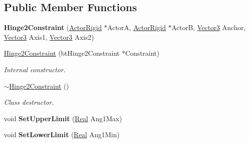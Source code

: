 \subsection*{Public Member Functions}
\begin{DoxyCompactItemize}
\item 
\hypertarget{classphys_1_1Hinge2Constraint_a3cc11d107f00c966f7e2c14713ea4e99}{
{\bfseries Hinge2Constraint} (\hyperlink{classphys_1_1ActorRigid}{ActorRigid} $\ast$ActorA, \hyperlink{classphys_1_1ActorRigid}{ActorRigid} $\ast$ActorB, \hyperlink{classphys_1_1Vector3}{Vector3} Anchor, \hyperlink{classphys_1_1Vector3}{Vector3} Axis1, \hyperlink{classphys_1_1Vector3}{Vector3} Axis2)}
\label{d2/d16/classphys_1_1Hinge2Constraint_a3cc11d107f00c966f7e2c14713ea4e99}

\item 
\hyperlink{classphys_1_1Hinge2Constraint_aaf937ddb299b8b47e243e83dfd585e44}{Hinge2Constraint} (btHinge2Constraint $\ast$Constraint)
\begin{DoxyCompactList}\small\item\em Internal constructor. \item\end{DoxyCompactList}\item 
\hyperlink{classphys_1_1Hinge2Constraint_a8e3f1210140b8205e20e4a07a3e63195}{$\sim$Hinge2Constraint} ()
\begin{DoxyCompactList}\small\item\em Class destructor. \item\end{DoxyCompactList}\item 
\hypertarget{classphys_1_1Hinge2Constraint_a0510219dca0c79d643411bd1183c5caf}{
void {\bfseries SetUpperLimit} (\hyperlink{namespacephys_af7eb897198d265b8e868f45240230d5f}{Real} Ang1Max)}
\label{d2/d16/classphys_1_1Hinge2Constraint_a0510219dca0c79d643411bd1183c5caf}

\item 
\hypertarget{classphys_1_1Hinge2Constraint_afce03aaa6e238c52027b9ab0e69304b0}{
void {\bfseries SetLowerLimit} (\hyperlink{namespacephys_af7eb897198d265b8e868f45240230d5f}{Real} Ang1Min)}
\label{d2/d16/classphys_1_1Hinge2Constraint_afce03aaa6e238c52027b9ab0e69304b0}

\end{DoxyCompactItemize}
